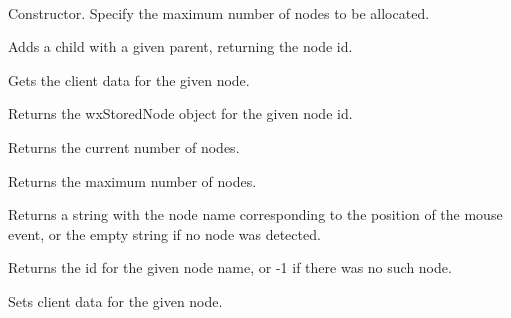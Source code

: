 
\\






Constructor. Specify the maximum number of nodes to be allocated.

\label{wxlayouttreestoredaddchild}


Adds a child with a given parent, returning the node id.

\label{wxlayouttreestoredgetclientdata}


Gets the client data for the given node.

\label{wxlayouttreestoredgetnode}


Returns the wxStoredNode object for the given node id.

\label{wxlayouttreestoredgetnodecount}


Returns the current number of nodes.

\label{wxlayouttreestoredgetnumnodes}


Returns the maximum number of nodes.

\label{wxlayouttreestoredhittest}


Returns a string with the node name corresponding to the position of the mouse event, or the empty string if no node
was detected.

\label{wxlayouttreestorednametoid}


Returns the id for the given node name, or -1 if there was no such node.

\label{wxlayouttreestoredsetclientdata}


Sets client data for the given node.

